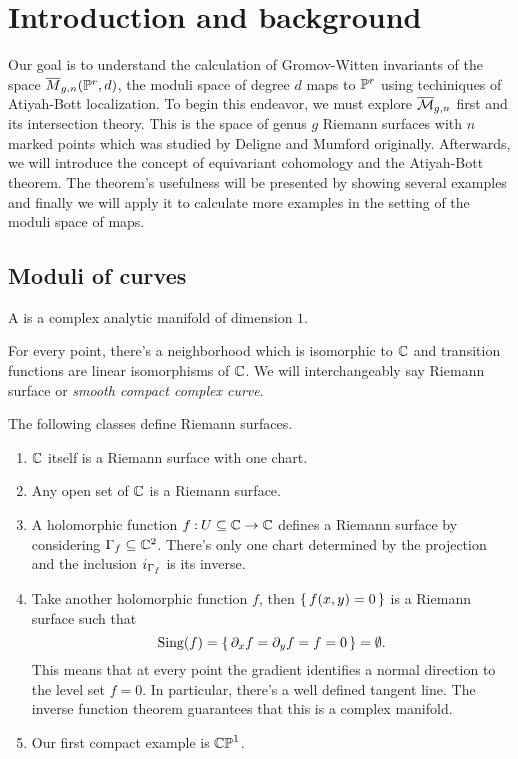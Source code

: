 \documentclass[12pt]{memoir}
\author{\nauthor}
\begin{document}
\chapter{Introduction and background}

Our goal is to understand the calculation of Gromov-Witten invariants of the space $\overline M_{g,n}(\mathbb{P}^r,d)$, the moduli space of degree $d$ maps to $\mathbb{P}^r$ using techiniques of Atiyah-Bott localization. To begin this endeavor, we must explore $\overline{\mathcal{M}}_{g,n}$ first and its intersection theory. This is the space of genus $g$ Riemann surfaces with $n$ marked points which was studied by Deligne and Mumford originally. Afterwards, we will introduce the concept of equivariant cohomology and the Atiyah-Bott theorem. The theorem's usefulness will be presented by showing several examples and finally we will apply it to calculate more examples in the setting of the moduli space of maps.

\section{Moduli of curves}

\begin{Def}
    A  is a complex analytic manifold of dimension $1$. 
\end{Def}
For every point, there's a neighborhood which is isomorphic to $\mathbb{C}$ and transition functions are linear isomorphisms of $\mathbb{C}$. We will interchangeably say Riemann surface or \emph{smooth compact complex curve}.
    
\begin{Ex}
        The following classes define Riemann surfaces.
        \begin{enumerate}
        \item $\mathbb{C}$ itself is a Riemann surface with one chart.
        \item Any open set of $\mathbb{C}$ is a Riemann surface.
        \item A holomorphic function $f\mathbin{:} U\subseteq\mathbb{C}\to\mathbb{C}$ defines a Riemann surface by considering $\Gamma_f\subseteq\mathbb{C}^2$. There's only one chart determined by the projection and the inclusion $i_{\Gamma_f}$ is its inverse.
        \item Take another holomorphic function $f$, then $\{\,f(x,y)=0\,\}$ is a Riemann surface such that 
        $$\text{Sing}(f)=\{\,\partial_xf=\partial_yf=f=0\,\}=\emptyset.$$
        This means that at every point the gradient identifies a normal direction to the level set $f=0$. In particular, there's a well defined tangent line. The inverse function theorem guarantees that this is a complex manifold. 
        \item Our first compact example is $\mathbb{CP}^1$.
        \end{enumerate}
\end{Ex}
\end{document}
